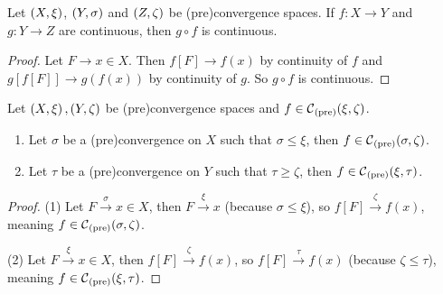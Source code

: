 \begin{lemma} \label{continuityComposition}
Let $\left( X,\xi \right)$, $\left( Y,\sigma \right)$ and $\left( Z,\zeta \right)$ be (pre)convergence spaces. If $f: X\to Y$ and $g: Y\to Z$ are continuous, then $g\circ f$ is continuous.
\end{lemma}
\begin{proof}
Let $F\to x\in X$. Then $f[F] \to f(x)$ by continuity of $f$ and $g[f[F]] \to g(f(x))$ by continuity of $g$. So $g\circ f$ is continuous.
\end{proof}

\begin{lemma} \label{finerCoarserContinuity}
Let $\left( X,\xi \right), \left( Y,\zeta \right)$ be (pre)convergence spaces and $f\in \operatorname{\mathcal{C}}_\text{(pre)}(\xi, \zeta)$.
\begin{enumerate}
\item Let $\sigma$ be a (pre)convergence on $X$ such that $\sigma \leq \xi$, then $f\in \operatorname{\mathcal{C}}_\text{(pre)}(\sigma, \zeta)$.
\item Let $\tau$ be a (pre)convergence on $Y$ such that $\tau \geq \zeta$, then $f\in \operatorname{\mathcal{C}}_\text{(pre)}(\xi, \tau)$.
\end{enumerate}
\end{lemma}
\begin{proof}
(1) Let $F\overset{\sigma}{\longrightarrow} x \in X$, then $F\overset{\xi}{\longrightarrow} x$ (because $\sigma \leq \xi$), so $f[F]\overset{\zeta}{\longrightarrow} f(x)$, meaning $f\in \operatorname{\mathcal{C}}_\text{(pre)}(\sigma, \zeta)$.

(2) Let $F\overset{\xi}{\longrightarrow} x \in X$, then $f[F]\overset{\zeta}{\longrightarrow} f(x)$, so $f[F]\overset{\tau}{\longrightarrow} f(x)$  (because $\zeta \leq \tau$), meaning $f\in \operatorname{\mathcal{C}}_\text{(pre)}(\xi, \tau)$.
\end{proof}

